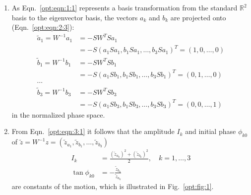 \documentclass[english]{article}
\begin{document}
\begin{enumerate}
\item As Eqn.~\ref{opt:eqn:1:1} represents a basis transformation from the standard $\mathbb{R}^2$ basis to the eigenvector basis, the vectors $a_k$ and $b_k$ are projected onto (Eqn.~\ref{opt:eqn:2:3}):
\begin{align}\label{opt:eqn:3:2}
\tilde a_1=W^{-1}a_1&=-SW^TSa_1\nonumber\\
&=-S(a_1Sa_1,b_1Sa_1,\ldots,b_3Sa_1)^T=(1,0,\ldots,0)\nonumber\\
\tilde b_1=W^{-1}b_1&=-SW^TSb_1\nonumber\\
&=-S(a_1Sb_1,b_1Sb_1,\ldots,b_3Sb_1)^T=(0,1,\ldots,0)\\
\cdots & \nonumber\\
\tilde b_3=W^{-1}b_3&=-SW^TSb_3\nonumber\\
&=-S(a_1Sb_3,b_1Sb_3,\ldots,b_3Sb_3)^T=(0,0,\ldots,1)\nonumber
\end{align}
in the normalized phase space.
\item From Eqn.~\ref{opt:eqn:3:1} it follows that the amplitude $I_k$ and initial phase $\phi_{k0}$ of $\tilde z=W^{-1}z=(\tilde z_{a_1},\tilde z_{b_1},\ldots,\tilde z_{b_3})$ 
\begin{align}
I_k&=\frac{(\tilde z_{a_k})^2 +(\tilde z_{b_k})^2}{2}, \quad k=1,\ldots,3\label{opt:eqn:20a}\\
\tan\phi_{k0}&=-\frac{\tilde z_{b_k}}{\tilde z_{a_k}} \label{opt:eqn:20b}
\end{align}
are constants of the motion, which is illustrated in Fig.~\ref{opt:fig:1}.
\begin{figure}[h]
	\centering

\end{figure}
\end{enumerate}
\end{document}
